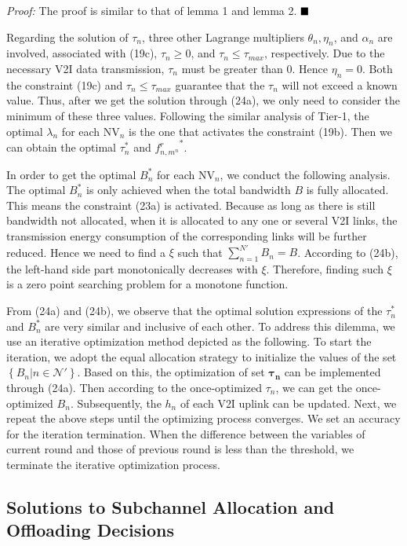 \documentclass[lettersize,journal]{IEEEtran}
\begin{document}
\emph{Proof:} The proof is similar to that of lemma 1 and lemma 2.  $\hfill\blacksquare$


Regarding the solution of $\tau_{n}$, three other Lagrange multipliers $\theta_n, \eta_n$, and $\alpha_n$ are involved, associated with (19c), $\tau_n \geq 0$, and $\tau_n \leq \tau_{max}$, respectively. Due to the necessary V2I data transmission, $\tau_{n}$ must be greater than 0. Hence $\eta_n =0$. Both the constraint (19c) and $\tau_n \leq \tau_{max}$ guarantee that the $\tau_{n}$ will not exceed a known value. Thus, after we get the solution through (24a), we only need to consider the minimum of these three values. Following the similar analysis of Tier-1, the optimal $\lambda_n$ for each NV$_n$ is the one that activates the constraint (19b). Then we can obtain the optimal $\tau^*_{n}$ and ${f^{r}_{n,m^n}}^*$.

In order to get the optimal $B^*_n$ for each NV$_n$, we conduct the following analysis. The optimal $B^*_n$ is only achieved when the total bandwidth $B$ is fully allocated. This means the constraint (23a) is activated. Because as long as there is still bandwidth not allocated, when it is allocated to any one or several V2I links, the transmission energy consumption of the corresponding links will be further reduced. Hence we need to find a $\xi$ such that $\sum_{n=1}^{N'} B_n = B$. According to (24b), the left-hand side part monotonically decreases with $\xi$. Therefore, finding such $\xi$ is a zero point searching problem for a monotone function.


From (24a) and (24b), we observe that the optimal solution expressions of the $\tau^*_{n}$ and $B^*_n$ are very similar and inclusive of each other. To address this dilemma, we use an iterative optimization method depicted as the following. To start the iteration, we adopt the equal allocation strategy to initialize the values of the set $\left\{B_n| n \in \mathcal{N'}\right\}$. Based on this, the optimization of set $\mathbf{\tau_n}$ can be implemented through (24a). Then according to the once-optimized $\tau_{n}$, we can get the once-optimized $B_n$. Subsequently, the $h_n$ of each V2I uplink can be updated. Next, we repeat the above steps until the optimizing process converges. We set an accuracy for the iteration termination. When the difference between the variables of current round and those of previous round is less than the threshold, we terminate the iterative optimization process.

\subsection{Solutions to Subchannel Allocation and Offloading Decisions}
\end{document}
